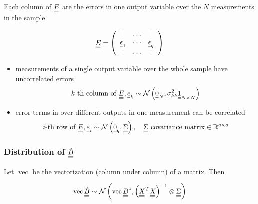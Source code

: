 Each column of $\mat{E}$ are the errors in one output variable over the $N$
measurements in the sample

\begin{equation}
    \mat{E}=\left(\begin{array}{ccc}
    \mid & \ldots & \mid \\
    \vec{\epsilon}_1 & \cdots & \vec{\epsilon}_q \\
    \mid & \ldots & \mid
    \end{array}\right)
\end{equation}

\begin{itemize}
    \item measurements of a single output variable over the whole sample have uncorrelated errors
    \begin{equation}
        k \text{-th column of } \mat{E}, \vec{e}_k \sim \mathcal{N}\left(\vec{0}_N, \sigma_{kk}^2 \mat{1}_{N \times N}\right)
    \end{equation}
    \item error terms in over different outputs in one measurement can be correlated
    \begin{equation}
        i\text{-th row of } \mat{E}, \vec{e}_i \sim \mathcal{N}\left(\vec{0}_q, \mat{\Sigma}\right), \quad \mat{\Sigma} \text{ covariance matrix} \in \mathbb{R}^{q \times q}
    \end{equation}
\end{itemize}

\subsubsection{Distribution of $\mat{\hat{B}}$}
Let $\operatorname{vec}$ be the vectorization (column under column) of
a matrix. Then

\begin{equation}
    \operatorname{vec} \mat{\hat{B}} \sim \mathcal{N}\left(\operatorname{vec} \mat{B}^*, \left( \mat{X}^T \mat{X} \right)^{-1} \otimes \mat{\Sigma} \right)
\end{equation}

